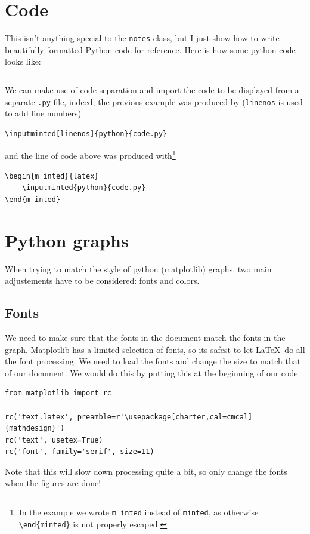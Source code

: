 \documentclass[letterpaper,11pt]{notes}
\theoremstyle{definition}
\theoremstyle{plain}
\theoremstyle{remark}
\begin{document}
\section{Code}

This isn't anything special to the \texttt{notes} class, but I just show how to write beautifully formatted Python code for reference. Here is how some python code looks like:
\inputminted[linenos]{python}{code.py}%
We can make use of code separation and import the code to be displayed from a separate \texttt{.py} file, indeed, the previous example was produced by (\texttt{linenos} is used to add line numbers)
\begin{verbatim}
\inputminted[linenos]{python}{code.py}
\end{verbatim}
and the line of code above was produced with\footnote{In the example we wrote \texttt{m inted} instead of \texttt{minted}, as otherwise \texttt{\textbackslash{}end\{minted\}} is not properly escaped.}
\begin{verbatim}
\begin{m inted}{latex}
    \inputminted{python}{code.py}
\end{m inted}
\end{verbatim}

\section{Python graphs}

When trying to match the style of python (matplotlib) graphs, two main adjustements have to be considered: fonts and colors.

\subsection{Fonts}

We need to make sure that the fonts in the document match the fonts in the graph. Matplotlib has a limited selection of fonts, so its safest to let \LaTeX\ do all the font processing. We need to load the fonts and change the size to match that of our document. We would do this by putting this at the beginning of our code
\begin{verbatim}
from matplotlib import rc

rc('text.latex', preamble=r'\usepackage[charter,cal=cmcal]{mathdesign}')
rc('text', usetex=True)
rc('font', family='serif', size=11)
\end{verbatim}

Note that this will slow down processing quite a bit, so \alert{only change the fonts when the figures are done!}
\end{document}
